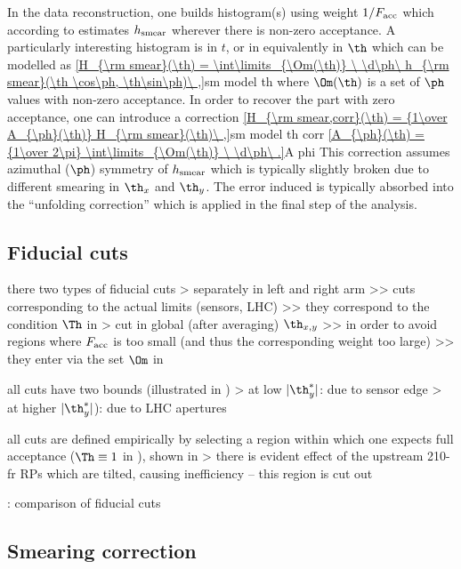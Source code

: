 In the data reconstruction, one builds histogram(s) using weight $1 / F_{\rm acc}$ which according to  estimates $h_{\rm smear}$ wherever there is non-zero acceptance. A particularly interesting histogram is in $t$, or in equivalently in $\th$ which can be modelled as
\eqref{H_{\rm smear}(\th) = \int\limits_{\Om(\th)} \ \d\ph\ h_{\rm smear}(\th \cos\ph, \th\sin\ph)\ ,}{sm model th}
where $\Om(\th)$ is a set of $\ph$ values with non-zero acceptance. In order to recover the part with zero acceptance, one can introduce a correction
\eqref{H_{\rm smear,corr}(\th) = {1\over A_{\ph}(\th)} H_{\rm smear}(\th)\ ,}{sm model th corr}
\eqref{A_{\ph}(\th) = {1\over 2\pi} \int\limits_{\Om(\th)} \ \d\ph\ .}{A phi}
This correction assumes azimuthal ($\ph$) symmetry of $h_{\rm smear}$ which is typically slightly broken due to different smearing in $\th_x$ and $\th_y$. The error induced is typically absorbed into the ``unfolding correction'' which is applied in the final step of the analysis.

\subsection{Fiducial cuts}

\> there two types of fiducial cuts
\>> separately in left and right arm
\>>> cuts corresponding to the actual limits (sensors, LHC)
\>>> they correspond to the condition $\Th$ in 
\>> cut in global (after averaging) $\th_{x, y}$
\>>> in order to avoid regions where $F_{\rm acc}$ is too small (and thus the corresponding weight too large)
\>>> they enter via the set $\Om$ in 

\> all cuts have two bounds (illustrated in )
\>> at low $|\th_y^*|$: due to sensor edge
\>> at higher $|\th_y^*|$): due to LHC apertures

\> all cuts are defined empirically by selecting a region within which one expects full acceptance ($\Th \equiv 1$ in ), shown in 
\>> there is evident effect of the upstream 210-fr RPs which are tilted, causing inefficiency -- this region is cut out

\> : comparison of fiducial cuts


\subsection{Smearing correction}

